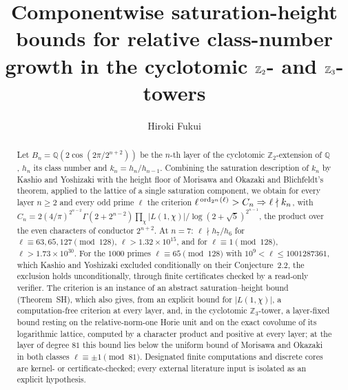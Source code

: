 \documentclass[11pt]{amsart}
\title[Componentwise saturation-height bounds]{Componentwise saturation-height bounds for relative class-number growth in the cyclotomic $\Z_2$- and $\Z_3$-towers}
\author{Hiroki Fukui}
\theoremstyle{remark}\newtheorem{remark}[theorem]{Remark}
\theoremstyle{definition}\newtheorem{definition}[theorem]{Definition}
\newcommand{\Q}{\mathbb{Q}}\newcommand{\Z}{\mathbb{Z}}\newcommand{\R}{\mathbb{R}}\newcommand{\F}{\mathbb{F}}
\begin{document}
\begin{abstract}
Let $B_n=\Q(2\cos(2\pi/2^{n+2}))$ be the $n$-th layer of the cyclotomic $\Z_2$-extension of $\Q$, $h_n$ its class number and $k_n=h_n/h_{n-1}$. Combining the saturation description of $k_n$ by Kashio and Yoshizaki with the height floor of Morisawa and Okazaki and Blichfeldt's theorem, applied to the lattice of a single saturation component, we obtain for every layer $n\ge2$ and every odd prime $\ell$ the criterion $\ell^{\,\operatorname{ord}_{2^n}(\ell)}>C_n\Rightarrow\ell\nmid k_n$, with $C_n=2(4/\pi)^{2^{n-2}}\Gamma(2+2^{n-2})\prod_{\chi}|L(1,\chi)|/\log(2+\sqrt5)^{2^{n-1}}$, the product over the even characters of conductor $2^{n+2}$. At $n=7$: $\ell\nmid h_7/h_6$ for $\ell\equiv63,65,127\pmod{128}$, $\ell>1.32\times10^{15}$, and for $\ell\equiv1\pmod{128}$, $\ell>1.73\times10^{30}$. For the $1000$ primes $\ell\equiv65\pmod{128}$ with $10^9<\ell\le1001287361$, which Kashio and Yoshizaki excluded conditionally on their Conjecture~2.2, the exclusion holds unconditionally, through finite certificates checked by a read-only verifier. The criterion is an instance of an abstract saturation--height bound (Theorem~SH), which also gives, from an explicit bound for $|L(1,\chi)|$, a computation-free criterion at every layer, and, in the cyclotomic $\Z_3$-tower, a layer-fixed bound resting on the relative-norm-one Horie unit and on the exact covolume of its logarithmic lattice, computed by a character product and positive at every layer; at the layer of degree $81$ this bound lies below the uniform bound of Morisawa and Okazaki in both classes $\ell\equiv\pm1\pmod{81}$. Designated finite computations and discrete cores are kernel- or certificate-checked; every external literature input is isolated as an explicit hypothesis.
\end{abstract}
\maketitle
\end{document}

